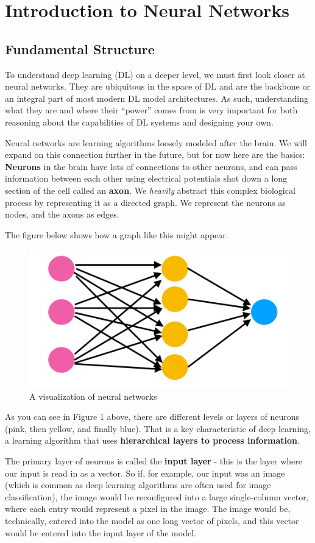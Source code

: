 \section{Introduction to Neural Networks}
\subsection{Fundamental Structure}
\begin{flushleft}
    \large {To understand deep learning (DL) on a deeper level, we must first look closer at neural networks. They are ubiquitous in the space of DL and are the backbone or an integral part of most modern DL model architectures. As such, understanding what they are and where their ``power'' comes from is very important for both reasoning about the capabilities of DL systems and designing your own. \break
    
    Neural networks are learning algorithms loosely modeled after the brain. We will expand on this connection further in the future, but for now here are the basics: \textbf{Neurons} in the brain have lots of connections to other neurons, and can pass information between each other using electrical potentials shot down a long section of the cell called an \textbf{axon}. We \textit{heavily} abstract this complex biological process by representing it as a directed graph. We represent the neurons as nodes, and the axons as edges. \break
    
    The figure below shows how a graph like this might appear.}
    \begin{figure}[H]
        \centering
        \includegraphics[width=0.5\linewidth]{dl/neuralnetwork.png}
        \caption{A visualization of neural networks}
        \label{fig:neuralnetwork}
    \end{figure}
\end{flushleft}

    \begin{flushleft}
    \large {As you can see in Figure 1 above, there are different levels or layers of neurons (pink, then yellow, and finally blue). That is a key characteristic of deep learning, a learning algorithm that uses \textbf{hierarchical layers to process information}. \break
    
    The primary layer of neurons is called the \textbf{input layer} - this is the layer where our input is read in as a vector. So if, for example, our input was an image (which is common as deep learning algorithms are often used for image classification), the image would be reconfigured into a large single-column vector, where each entry would represent a pixel in the image. The image would be, technically, entered into the model as one long vector of pixels, and this vector would be entered into the input layer of the model.}
    \end{flushleft}

